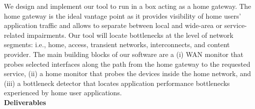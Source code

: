 \documentclass[11 pt]{article}
\begin{document}
We design and implement our tool to run in a box  acting as a home gateway. The home gateway is the ideal vantage point as it provides visibility of home users' application traffic and allows to separate between local and wide-area or service-related impairments. Our tool will locate bottlenecks at the level of network segments: i.e., home, access, transient networks, interconnects, and content provider. The main building blocks of our software are a (i) WAN monitor that probes selected interfaces along the path from the home gateway to the requested service, (ii) a home monitor that probes the devices inside the home network, and (iii) a bottleneck detector that locates application performance bottlenecks experienced by home user applications.\\

\textbf{Deliverables}
\end{document}
